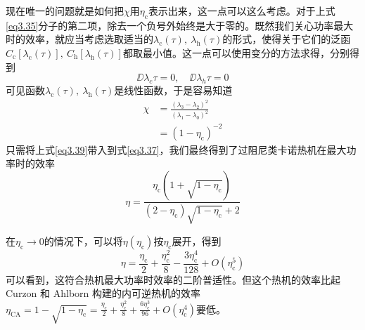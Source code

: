 现在唯一的问题就是如何把$\chi$用$\eta_{\mathrm{c}}$表示出来，这一点可以这么考虑。对于上式\eqref{eq3.35}分子的第二项，除去一个负号外始终是大于零的。既然我们关心功率最大时的效率，就应当考虑选取适当的$\lambda_{\mathrm{c}}(\tau),\ \lambda_{\mathrm{h}}(\tau)$的形式，使得关于它们的泛函$C_{\mathrm{c}} [\lambda_{\mathrm{c}}(\tau)],\ C_{\mathrm{h}} [\lambda_{\mathrm{h}}(\tau)]$都取最小值。这一点可以使用变分的方法求得，分别得到
\begin{equation}
    \DD{\lambda_{c}}{\tau}=0,\quad \DD{\lambda_{h}}{\tau}=0
    \label{eq3.38}
\end{equation}
可见函数$\lambda_{\mathrm{c}}(\tau),\ \lambda_{\mathrm{h}}(\tau)$是线性函数，于是容易知道
\begin{equation}
    \begin{split}
        \chi&=\frac{{\left(\lambda_3 - \lambda_2\right)}^2}{{\left(\lambda_1 - \lambda_0\right)}^2}\\
        &= {(1-\eta_{\mathrm{c}})}^{-2}
    \end{split}
    \label{eq3.39}
\end{equation}
只需将上式\eqref{eq3.39}带入到式\eqref{eq3.37}，我们最终得到了过阻尼类卡诺热机在最大功率时的效率
\begin{equation}
    \eta=\frac{\eta_{\mathrm{c}}\left(1+\sqrt{1-\eta_{\mathrm{c}}}\right)}{\left(2-\eta_{\mathrm{c}}\right) \sqrt{1-\eta_{\mathrm{c}}}+2}
    \label{eq3.40}
\end{equation}

在$\eta_{\mathrm{c}} \to 0$的情况下，可以将$\eta(\eta_{\mathrm{c}})$按$\eta_{\mathrm{c}}$展开，得到
\begin{equation}
    \eta = \frac{\eta_{\mathrm{c}}}{2}+\frac{\eta_{\mathrm{c}}^2}{8}-\frac{3 \eta_{\mathrm{c}}^4}{128}+O\left(\eta_{\mathrm{c}}^5\right)
    \label{eq3.41}
\end{equation}
可以看到，这符合热机最大功率时效率的二阶普适性。但这个热机的效率比起Curzon 和 Ahlborn 构建的内可逆热机\cite{Curzon1975}的效率$\eta_{\mathrm{CA}}=1-\sqrt{1-\eta_{\mathrm{c}}}=\frac{\eta_{\mathrm{c}}}{2}+\frac{\eta_{\mathrm{c}}^{2}}{8}+\frac{6 \eta_{\mathrm{c}}^{3}}{96}+O\left(\eta_{\mathrm{c}}^{4}\right)$要低。



